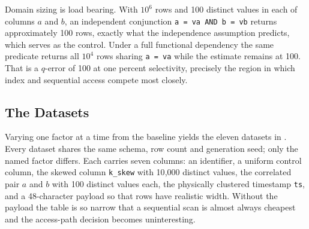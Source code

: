 \documentclass[12pt, a4paper]{article}
\begin{document}
Domain sizing is load bearing. With $10^6$ rows and 100 distinct values
in each of columns $a$ and $b$, an independent conjunction
\texttt{a = va AND b = vb} returns approximately 100 rows, exactly what
the independence assumption predicts, which serves as the control. Under
a full functional dependency the same predicate returns all $10^4$ rows
sharing \texttt{a = va} while the estimate remains at 100. That is a
$q$-error of 100 at one percent selectivity, precisely the region in
which index and sequential access compete most closely.

\subsection{The Datasets}
\label{sec:datasets}

Varying one factor at a time from the baseline yields the eleven
datasets in . Every dataset shares the same schema,
row count and generation seed; only the named factor differs. Each
carries seven columns: an identifier, a uniform control column, the
skewed column \texttt{k\_skew} with 10{,}000 distinct values, the
correlated pair $a$ and $b$ with 100 distinct values each, the
physically clustered timestamp \texttt{ts}, and a 48-character payload
so that rows have realistic width. Without the payload the table is so
narrow that a sequential scan is almost always cheapest and the
access-path decision becomes uninteresting.
\end{document}
